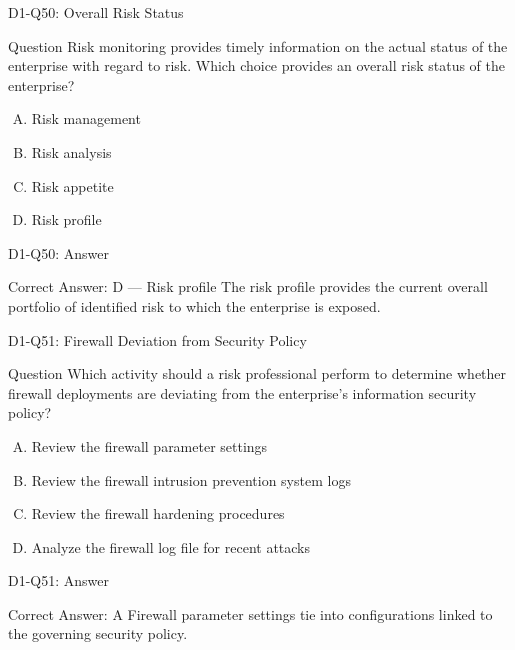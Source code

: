 \documentclass{beamer}
\begin{document}
	\begin{frame}{D1-Q50: Overall Risk Status}
		\begin{block}{Question}
			Risk monitoring provides timely information on the actual status of the enterprise with regard to risk. Which choice provides an overall risk status of the enterprise?
		\end{block}
		\begin{enumerate}[(A)]
			\item Risk management
			\item Risk analysis
			\item Risk appetite
			\item Risk profile
		\end{enumerate}
	\end{frame}
	\begin{frame}{D1-Q50: Answer}
		\begin{block}{Correct Answer: D --- Risk profile}
			The risk profile provides the current overall portfolio of identified risk to which the enterprise is exposed.
		\end{block}
	\end{frame}
	
	\begin{frame}{D1-Q51: Firewall Deviation from Security Policy}
		\begin{block}{Question}
			Which activity should a risk professional perform to determine whether firewall deployments are deviating from the enterprise's information security policy?
		\end{block}
		\begin{enumerate}[(A)]
			\item Review the firewall parameter settings
			\item Review the firewall intrusion prevention system logs
			\item Review the firewall hardening procedures
			\item Analyze the firewall log file for recent attacks
		\end{enumerate}
	\end{frame}
	\begin{frame}{D1-Q51: Answer}
		\begin{block}{Correct Answer: A}
			Firewall parameter settings tie into configurations linked to the governing security policy.
		\end{block}
	\end{frame}
	
\end{document}
